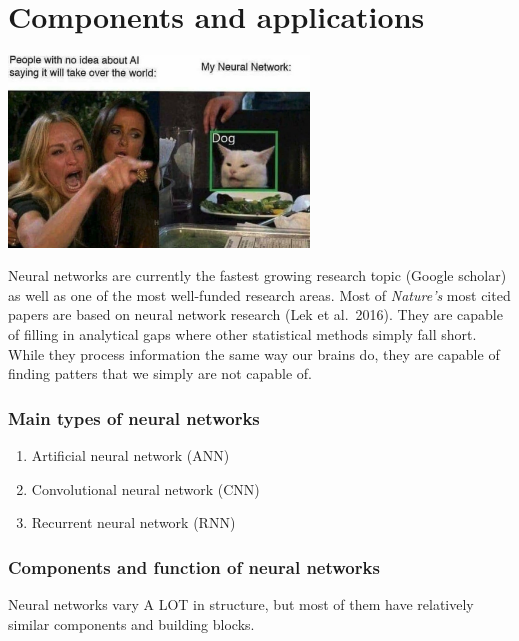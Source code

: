 \documentclass[
]{article}
\providecommand{\tightlist}{%
  \setlength{\itemsep}{0pt}\setlength{\parskip}{0pt}}
\begin{document}
\hypertarget{components-and-applications}{%
\section{Components and
applications}\label{components-and-applications}}

\includegraphics[width=0.6\textwidth,height=\textheight]{media/meme.png}

Neural networks are currently the fastest growing research topic (Google
scholar) as well as one of the most well-funded research areas. Most of
\emph{Nature's} most cited papers are based on neural network research
(Lek et al.~2016). They are capable of filling in analytical gaps where
other statistical methods simply fall short. While they process
information the same way our brains do, they are capable of finding
patters that we simply are not capable of.

\hypertarget{main-types-of-neural-networks}{%
\subsubsection{Main types of neural
networks}\label{main-types-of-neural-networks}}

\begin{enumerate}
\def\labelenumi{\arabic{enumi}.}
\tightlist
\item
  Artificial neural network (ANN)
\item
  Convolutional neural network (CNN)
\item
  Recurrent neural network (RNN)
\end{enumerate}

\hypertarget{components-and-function-of-neural-networks}{%
\subsubsection{Components and function of neural
networks}\label{components-and-function-of-neural-networks}}

Neural networks vary A LOT in structure, but most of them have
relatively similar components and building blocks.
\end{document}
